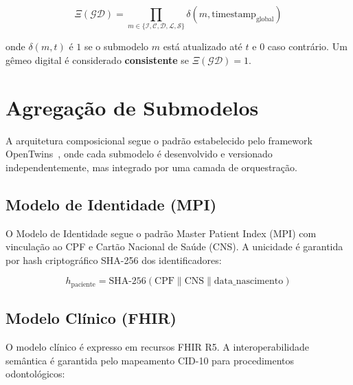 \begin{equation}
\label{eq:consistencia}
\Xi(\mathcal{GD}) = \prod_{m \in \{\mathcal{I},\mathcal{C},\mathcal{D},\mathcal{L},\mathcal{S}\}} \delta(m, \text{timestamp}_{\text{global}})
\end{equation}

onde $\delta(m, t)$ é $1$ se o submodelo $m$ está atualizado até $t$ e $0$ caso contrário. Um gêmeo digital é considerado \textbf{consistente} se $\Xi(\mathcal{GD}) = 1$.

\section{Agregação de Submodelos}
\label{sec:agregacao}

A arquitetura composicional segue o padrão estabelecido pelo framework OpenTwins~\cite{robles2023opentwins}, onde cada submodelo é desenvolvido e versionado independentemente, mas integrado por uma camada de orquestração.

\subsection{Modelo de Identidade (MPI)}
\label{subsec:modelo-identidade}

O Modelo de Identidade segue o padrão Master Patient Index (MPI) com vinculação ao CPF e Cartão Nacional de Saúde (CNS). A unicidade é garantida por hash criptográfico SHA-256 dos identificadores:

\begin{equation}
\label{eq:hash-identidade}
h_{\text{paciente}} = \text{SHA-256}(\text{CPF} \parallel \text{CNS} \parallel \text{data\_nascimento})
\end{equation}

\subsection{Modelo Clínico (FHIR)}
\label{subsec:modelo-clinico}

O modelo clínico é expresso em recursos FHIR R5. A interoperabilidade semântica é garantida pelo mapeamento CID-10 para procedimentos odontológicos:

